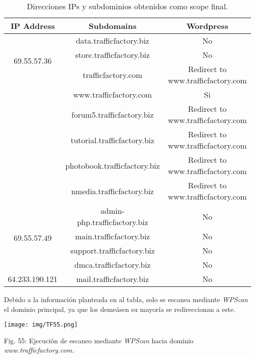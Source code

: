 \documentclass[12pt,oneside,a4paper]{book}
\begin{document}
\begin{table}[H]
    \centering
    \begin{tabular}{|c|c|c|}
        \hline
        \textbf{IP Address} & \textbf{Subdomains} & \textbf{Wordpress} \\
        \hline
        \multirow{3}{*}{69.55.57.36} & data.trafficfactory.biz & No \\
        \cline{3-3}
        & store.trafficfactory.biz & No \\
        \hline
        \multirow{6}{*}{69.55.57.37} & trafficfactory.com & Redirect to www.trafficfactory.com \\
        \cline{3-3}
        & www.trafficfactory.com & Si \\
        \cline{3-3}
        & forum5.trafficfactory.biz & Redirect to www.trafficfactory.com \\
         \cline{3-3}
        & tutorial.trafficfactory.biz & Redirect to www.trafficfactory.com \\
         \cline{3-3}
        & photobook.trafficfactory.biz & Redirect to www.trafficfactory.com \\
         \cline{3-3}
        & nmedia.trafficfactory.biz & Redirect to www.trafficfactory.com \\
        \hline
        \multirow{4}{*}{69.55.57.49} & admin-php.trafficfactory.biz & No \\
        \cline{3-3}
        & main.trafficfactory.biz & No \\
        \cline{3-3}
        & support.trafficfactory.biz & No \\
        \cline{3-3}
        & dmca.trafficfactory.biz & No \\
        \hline
        64.233.190.121 & mail.trafficfactory.biz & No \\
        \hline
    \end{tabular}
    \caption{Direcciones IPs y subdominios obtenidos como scope final.}
    \label{tab:mylabel}
\end{table}

\vspace{1em}

\hspace{20pt}
Debido a la información planteada en al tabla, solo se escanea mediante \textit{WPScan} el dominio principal, ya que los demeásen su mayoría se redireccionan a este.

\vspace{2em}

\begin{center}
	\texttt{[image: img/TF55.png]}
    
\vspace{0.1em}
    
    Fig. 55: Ejecución de escaneo mediante \textit{WPScan} hacia dominio \textit{www.trafficfactory.com}.
\end{center}
\end{document}
